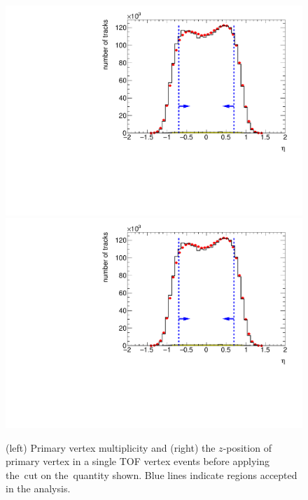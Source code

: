 \begin{figure}[h!]
	\centering
	\includegraphics[width=.49\textwidth, page=11]{chapters/chrgSTAR/img/selection/SDT.pdf}
	\includegraphics[width=.49\textwidth, page=5]{chapters/chrgSTAR/img/selection/SDT.pdf}
	\caption{(left) Primary vertex multiplicity  and  (right) the $z$-position of primary vertex in a single TOF vertex events before applying  the~cut on the~quantity shown. Blue lines indicate regions accepted in the analysis.}
	\label{fig:vertexSTAR}
\end{figure}

\FloatBarrier